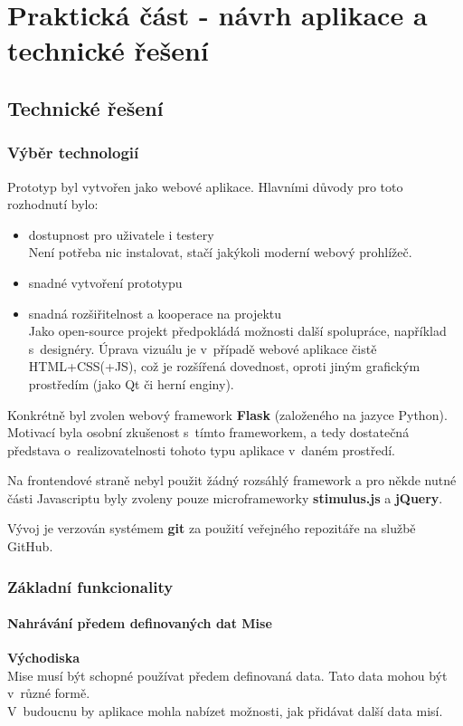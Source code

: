 \chapter{Praktická část - návrh aplikace a technické řešení}


\section{Technické řešení}
\subsection{Výběr technologií}
Prototyp byl vytvořen jako webové aplikace.
Hlavními důvody pro toto rozhodnutí bylo:
\begin{itemize}
	\item dostupnost pro uživatele i testery\\
	Není potřeba nic instalovat, stačí jakýkoli moderní webový prohlížeč.
	\item snadné vytvoření prototypu
	\item snadná rozšiřitelnost a kooperace na projektu\\ Jako open-source projekt předpokládá možnosti další spolupráce, například s~designéry. Úprava vizuálu je v~případě webové aplikace čistě HTML+CSS(+JS), což je rozšířená dovednost, oproti jiným grafickým prostředím (jako Qt či herní enginy).
\end{itemize}

Konkrétně byl zvolen webový framework \textbf{Flask} (založeného na jazyce Python). Motivací byla osobní zkušenost s~tímto frameworkem, a tedy dostatečná představa o~realizovatelnosti tohoto typu aplikace v~daném prostředí.

Na frontendové straně nebyl použit žádný rozsáhlý framework a pro někde nutné části Javascriptu byly zvoleny pouze microframeworky \textbf{stimulus.js} a \textbf{jQuery}.

Vývoj je verzován systémem \textbf{git} za použití veřejného repozitáře na službě GitHub.

\subsection{Základní funkcionality}
\subsubsection*{Nahrávání předem definovaných dat Mise}
	\textbf{Východiska}\\
	Mise musí být schopné používat předem definovaná data. Tato data mohou být v~různé formě.\\
	V~budoucnu by aplikace mohla nabízet možnosti, jak přidávat další data misí.
	
